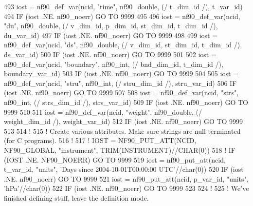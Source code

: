 \begin{DoxyCode}
493     iost    = nf90\_def\_var(ncid, \textcolor{stringliteral}{"time"}, nf90\_double, (/ t\_dim\_id /), t\_var\_id)
494     \textcolor{keywordflow}{IF} (iost .NE. nf90\_noerr) \textcolor{keywordflow}{GO TO} 9999
495 
496     iost    = nf90\_def\_var(ncid, \textcolor{stringliteral}{"du"}, nf90\_double, (/ v\_dim\_id, p\_dim\_id, st\_dim\_id, t\_dim\_id /), 
      du\_var\_id)
497     \textcolor{keywordflow}{IF} (iost .NE. nf90\_noerr) \textcolor{keywordflow}{GO TO} 9999
498 
499     iost    = nf90\_def\_var(ncid, \textcolor{stringliteral}{"ds"}, nf90\_double, (/ v\_dim\_id, st\_dim\_id, t\_dim\_id /), ds\_var\_id)
500     \textcolor{keywordflow}{IF} (iost .NE. nf90\_noerr) \textcolor{keywordflow}{GO TO} 9999
501 
502     iost    = nf90\_def\_var(ncid, \textcolor{stringliteral}{"boundary"}, nf90\_int, (/ bnd\_dim\_id, t\_dim\_id /), boundary\_var\_id)
503     \textcolor{keywordflow}{IF} (iost .NE. nf90\_noerr) \textcolor{keywordflow}{GO TO} 9999
504 
505     iost    = nf90\_def\_var(ncid, \textcolor{stringliteral}{"stru"}, nf90\_int, (/ stru\_dim\_id /), stru\_var\_id)
506     \textcolor{keywordflow}{IF} (iost .NE. nf90\_noerr) \textcolor{keywordflow}{GO TO} 9999
507 
508     iost    = nf90\_def\_var(ncid, \textcolor{stringliteral}{"strs"}, nf90\_int, (/ strs\_dim\_id /), strs\_var\_id)
509     \textcolor{keywordflow}{IF} (iost .NE. nf90\_noerr) \textcolor{keywordflow}{GO TO} 9999
510 
511     iost    = nf90\_def\_var(ncid, \textcolor{stringliteral}{"weight"}, nf90\_double, (/ weight\_dim\_id /), weight\_var\_id)
512     \textcolor{keywordflow}{IF} (iost .NE. nf90\_noerr) \textcolor{keywordflow}{GO TO} 9999
513 
514     \textcolor{comment}{!}
515     \textcolor{comment}{! Create various attributes. Make sure strings are null terminated (for C programs).}
516     \textcolor{comment}{!}
517 \textcolor{comment}{!    IOST    = NF90\_PUT\_ATT(NCID, NF90\_GLOBAL, "instrument", TRIM(INSTRUMENT)//CHAR(0))}
518 \textcolor{comment}{!    IF (IOST .NE. NF90\_NOERR) GO TO 9999}
519     iost    = nf90\_put\_att(ncid, t\_var\_id, \textcolor{stringliteral}{"units"}, \textcolor{stringliteral}{'Days since 2004-10-01T00:00:00 UTC'}//char(0))
520     \textcolor{keywordflow}{IF} (iost .NE. nf90\_noerr) \textcolor{keywordflow}{GO TO} 9999
521     iost    = nf90\_put\_att(ncid, p\_var\_id, \textcolor{stringliteral}{"units"}, \textcolor{stringliteral}{'hPa'}//char(0))
522     \textcolor{keywordflow}{IF} (iost .NE. nf90\_noerr) \textcolor{keywordflow}{GO TO} 9999
523 
524     \textcolor{comment}{!}
525     \textcolor{comment}{! We've finished defining stuff, leave the definition mode.}

\end{DoxyCode}
